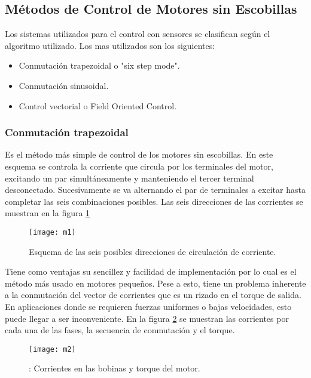 
\subsection{Métodos de Control de Motores sin Escobillas}
\label{subsection: metodos_control_motores}

Los sistemas utilizados para el control con sensores se clasifican según el algoritmo utilizado. Los mas utilizados son los siguientes: 

\begin{itemize}
\item Conmutación trapezoidal o "six step mode".
\item Conmutación sinusoidal.
\item Control vectorial o Field Oriented Control.
\end{itemize}

\subsubsection{Conmutación trapezoidal}
\label{conmutacion_trapezoidal}

Es el método más simple de control de los motores sin escobillas. En este esquema se controla la corriente que circula por los terminales del motor, excitando un par simultáneamente y manteniendo el tercer terminal desconectado. Sucesivamente se va alternando el par de terminales a excitar hasta completar las seis combinaciones posibles. Las seis direcciones de las corrientes se muestran en la figura \ref{fig:trapezoidal}

\begin{figure}[h]
  \centering
  \texttt{[image: m1]}
  \caption{Esquema de las seis posibles direcciones de circulación de corriente.}\label{fig:trapezoidal}
\end{figure}

Tiene como ventajas su sencillez y facilidad de implementación por lo cual es el método más usado en motores pequeños. Pese a esto, tiene un problema inherente a la conmutación del vector de corrientes que es un rizado en el torque de salida. En aplicaciones donde se requieren fuerzas uniformes o bajas velocidades, esto puede llegar a ser inconveniente. En la figura \ref{fig:corrientes_bobinas} se muestran las corrientes por cada una de las fases, la secuencia de conmutación y el torque.

\begin{figure}[h]
  \centering
  \texttt{[image: m2]}
  \caption{: Corrientes en las bobinas y torque del motor.}\label{fig:corrientes_bobinas}
\end{figure}


